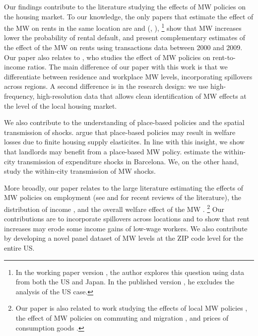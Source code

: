 
Our findings contribute to the literature studying the effects of MW policies 
on the housing market.
To our knowledge, the only papers that estimate the effect of the MW on rents 
in the same location are \textcite{Tidemann2018} and \citeauthor{Yamagishi2019} 
(\cite*{Yamagishi2019}, \cite*{Yamagishi2021}),%
\footnote{In the working paper version \parencite{Yamagishi2019}, the author 
explores this question using data from both the US and Japan.
In the published version \parencite{Yamagishi2021}, he excludes the analysis of 
the US case.}
\textcite{AgarwalEtAl2021} show that MW increases lower the probability of 
rental default, and present complementary estimates of the effect of the MW 
on rents using transactions data between 2000 and 2009.
Our paper also relates to \textcite{Hughes2020}, who studies the effect of 
MW policies on rent-to-income ratios.
The main difference of our paper with this work is that we differentiate 
between residence and workplace MW levels, incorporating spillovers across 
regions.
A second difference is in the research design: we use high-frequency,
high-resolution data that allows clean identification of MW effects at the level 
of the local housing market.

We also contribute to the understanding of place-based policies and the spatial 
transmission of shocks.
\textcite{KlineMoretti2014} argue that place-based policies may result in 
welfare losses due to finite housing supply elasticites.
In line with this insight, we show that landlords may benefit from a place-based 
MW policy.
\textcite{AllenEtAl2020} estimate the within-city transmission of expenditure 
shocks in Barcelona.
We, on the other hand, study the within-city transmission of MW shocks.

More broadly, our paper relates to the large literature estimating the effects
of MW policies on employment
(see \cite{Dube2019} and \cite{NeumarkShirley2021} for recent reviews of the 
literature), 
the distribution of income \parencite[e.g.,][]{Lee1999, AutorEtAl2016, 
Dube2019Income}, 
and the overall welfare effect of the MW \parencite{AhlfeldtEtAl2022,
BergerHerkenhoffMongey2022}.%
\footnote{Our paper is also related to work studying 
the effects of local MW policies 
\parencite[e.g.,][]{DubeLindner2021, JardimEtAl2022seattle}, 
the effect of MW policies on commuting and migration 
\parencite[e.g.,]{Cadena2014, Monras2019, PerezPerez2021}, 
and prices of consumption goods 
\parencite[e.g.,]{AllegrettoReich2018, Leung2021}.}
Our contributions are to incorporate spillovers across locations 
\parencite[as in the recent work by][]{JardimEtAl2022discontinuity} and to show 
that rent increases may erode some income gains of low-wage workers.
We also contribute by developing a novel panel dataset of MW levels at the 
ZIP code level for the entire US.

